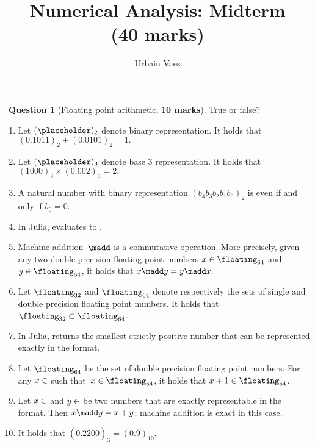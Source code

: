 \documentclass[10pt]{article}
\theoremstyle{definition}
\newtheorem{question}{{\normalfont \faGears}~Question}
\theoremstyle{remark}
\begin{document}
\title{Numerical Analysis: Midterm \\
\small{(\textbf{40 marks})}}
\author{Urbain Vaes}
\maketitle

\begin{question}
    [Floating point arithmetic, \textbf{10 marks}]
    True or false?
    \begin{enumerate}
        \item
            Let $(\placeholder)_2$ denote binary representation.
            It holds that
            \(
                (0.1011)_2 + (0.0101)_2 = 1.
            \)

        \item
            Let $(\placeholder)_3$ denote base 3 representation.
            It holds that
            \(
                (1000)_3 \times (0.002)_3 = 2.
            \)

        \item
            A natural number with binary representation $(b_4 b_3 b_2 b_1 b_0)_2$ is even if and only if $b_0 = 0$.

        \item
            In Julia,  evaluates to .

        \item
            Machine addition~$\madd$ is a commutative operation.
            More precisely, given any two double-precision floating point numbers $x \in \floating_{64}$ and $y \in \floating_{64}$,
            it holds that
            \(
                x \madd y = y \madd x.
            \)

        \item
            Let $\floating_{32}$ and $\floating_{64}$ denote respectively the sets of single and double precision floating point numbers.
            It holds that $\floating_{32} \subset \floating_{64}$.

        \item
            In Julia,  returns the smallest strictly positive number that can be represented exactly in the  format.

        \item
            Let $\floating_{64}$ be the set of double precision floating point numbers.
            For any $x \in \real$ such that~$x \in \floating_{64}$,
            it holds that $x + 1 \in \floating_{64}$.

        \item
            Let $x \in \real$ and $y \in \real$ be two numbers that are exactly representable in the  format.
            Then $x \madd y = x + y$: machine addition is exact in this case.

        \item
            It holds that $(0.\overline{2200})_3 = (0.9)_{10}$.
    \end{enumerate}
\end{question}
\end{document}
